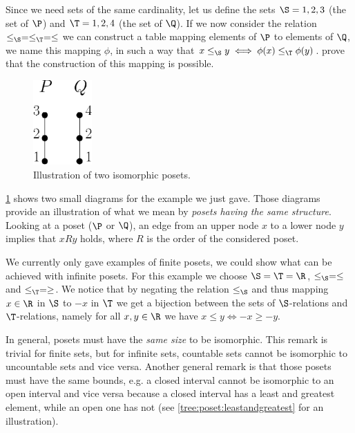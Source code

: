 Since we need sets of the same cardinality, let us define the sets $\S = {1, 2,
3}$ (the set of $\P$) and $\T = {1, 2, 4}$ (the set of $\Q$). If we now consider
the relation $\le_{\S} = \le_{\T} = \le$ we can construct a table mapping elements of
$\P$ to elements of $\Q$, we name this mapping $\phi$, in such a way that $x
\le_{\S} y \iff \phi(x) \le_{\T} \phi(y)$. 
prove that the construction of this mapping is possible.

\begin{figure}
	\centering
	\includegraphics[width=0.2\textwidth]{fig/poset/iso/a}
	\caption{Illustration of two isomorphic posets.}
	\label{fig:poset:iso:a}
\end{figure}

\ref{fig:poset:iso:a} shows two small diagrams for the example we just gave.
Those diagrams provide an illustration of what we mean by \emph{posets having
the same structure}. Looking at a poset ($\P$ or $\Q$), an edge from an upper
node $x$ to a lower node $y$ implies that $x R y$ holds, where $R$ is the order
of the considered poset.


We currently only gave examples of finite posets, we could show what can be
achieved with infinite posets. For this example we choose $\S = \T = \R$,
$\le_{\S} = \le$ and $\le_{\T} = \ge$. We notice that by negating the relation
$\le_{\S}$ and thus mapping $x \in \R$ in $\S$ to $-x$ in $\T$ we get a
bijection between the sets of $\S$-relations and $\T$-relations, namely for all
$x, y \in \R$ we have $x \le y \iff -x \ge -y$.

In general, posets must have the \emph{same size} to be isomorphic. This remark
is trivial for finite sets, but for infinite sets, countable sets cannot be
isomorphic to uncountable sets and vice versa. Another general remark is that
those posets must have the same bounds, e.g. a closed interval cannot be
isomorphic to an open interval and vice versa because a closed interval has a
least and greatest element, while an open one has not (see
\ref{tree:poset:leastandgreatest} for an illustration).

